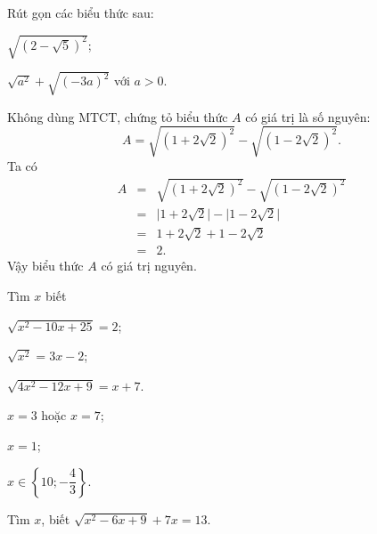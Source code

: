 \begin{bt} %
	Rút gọn các biểu thức sau:
	\begin{enumEX}{2}
	\item $\sqrt{(2-\sqrt{5})^{2}}$;
	\item $\sqrt{a^{2}}+\sqrt{(-3 a)^{2}}$ với $a>0$.
	\end{enumEX}
\end{bt}
\begin{bt}
	Không dùng $\mathrm{MTCT}$, chứng tỏ biểu thức $A$ có giá trị là số nguyên:
	$$A=\sqrt{\left(1+2\sqrt{2}\right)^2}-\sqrt{\left(1-2\sqrt{2}\right)^2}.$$
	\loigiai
	{
	Ta có \allowdisplaybreaks
	\begin{eqnarray*}
	A&=&\sqrt{\left(1+2\sqrt{2}\right)^2}-\sqrt{\left(1-2\sqrt{2}\right)^2}\\
	&=&\big|1+2\sqrt{2}\big|-\big|1-2\sqrt{2}\big|\\
	&=& 1+2\sqrt{2}+1-2\sqrt{2}\\
	&=& 2.
	\end{eqnarray*}
	Vậy biểu thức $A$ có giá trị nguyên.	
	}
\end{bt}
\begin{bt}%
	Tìm $x$ biết
	\begin{listEX}[3]
	\item $\sqrt{x^2-10x+25}=2$;
	\item $\sqrt{x^2}=3x-2$;
	\item $\sqrt{4x^2-12x+9}=x+7$.
	\end{listEX}
	\loigiai
	{
	\begin{listEX}[3]
	\item $x=3$ hoặc $x=7$;
	\item $x=1$;
	\item $x\in\left\lbrace 10;-\dfrac{4}{3}\right\rbrace$.
	\end{listEX}	}
\end{bt}
\begin{bt}%
	Tìm $x$, biết $\sqrt{x^2 - 6x + 9} + 7x = 13$.
\end{bt}
